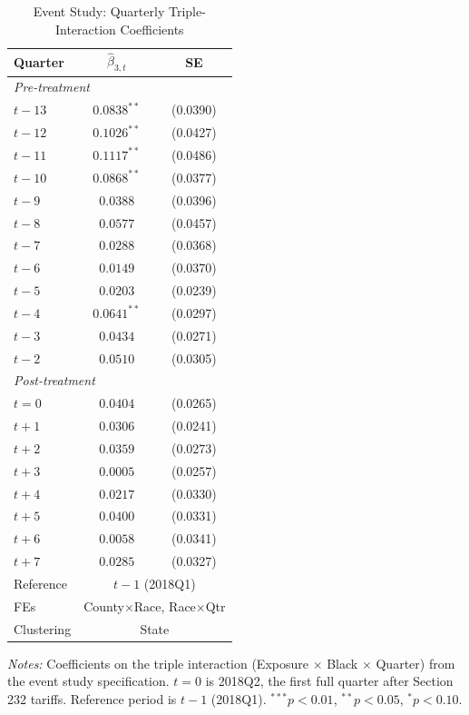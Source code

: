 \begin{table}
\begin{threeparttable}[htbp]
\centering
\caption{Event Study: Quarterly Triple-Interaction Coefficients}
\label{tab:eventstudy}
\begin{tabular}{lcc}
\toprule
Quarter & $\hat{\beta}_{3,t}$ & SE \\
\midrule
\multicolumn{3}{l}{\textit{Pre-treatment}} \\[3pt]
$t-13$ & $0.0838^{**}$ & (0.0390) \\
$t-12$ & $0.1026^{**}$ & (0.0427) \\
$t-11$ & $0.1117^{**}$ & (0.0486) \\
$t-10$ & $0.0868^{**}$ & (0.0377) \\
$t-9$ & $0.0388$ & (0.0396) \\
$t-8$ & $0.0577$ & (0.0457) \\
$t-7$ & $0.0288$ & (0.0368) \\
$t-6$ & $0.0149$ & (0.0370) \\
$t-5$ & $0.0203$ & (0.0239) \\
$t-4$ & $0.0641^{**}$ & (0.0297) \\
$t-3$ & $0.0434$ & (0.0271) \\
$t-2$ & $0.0510$ & (0.0305) \\
\midrule
\multicolumn{3}{l}{\textit{Post-treatment}} \\[3pt]
$t=0$ & $0.0404$ & (0.0265) \\
$t+1$ & $0.0306$ & (0.0241) \\
$t+2$ & $0.0359$ & (0.0273) \\
$t+3$ & $0.0005$ & (0.0257) \\
$t+4$ & $0.0217$ & (0.0330) \\
$t+5$ & $0.0400$ & (0.0331) \\
$t+6$ & $0.0058$ & (0.0341) \\
$t+7$ & $0.0285$ & (0.0327) \\
\midrule
Reference & \multicolumn{2}{c}{$t-1$ (2018Q1)} \\
FEs & \multicolumn{2}{c}{County$\times$Race, Race$\times$Qtr} \\
Clustering & \multicolumn{2}{c}{State} \\
\bottomrule
\end{tabular}
\begin{tablenotes}
\small
\item \textit{Notes:} Coefficients on the triple interaction (Exposure $\times$ Black $\times$ Quarter) from the event study specification. $t=0$ is 2018Q2, the first full quarter after Section 232 tariffs. Reference period is $t-1$ (2018Q1). $^{***}p<0.01$, $^{**}p<0.05$, $^{*}p<0.10$.
\end{tablenotes}
\end{threeparttable}
\end{table}
